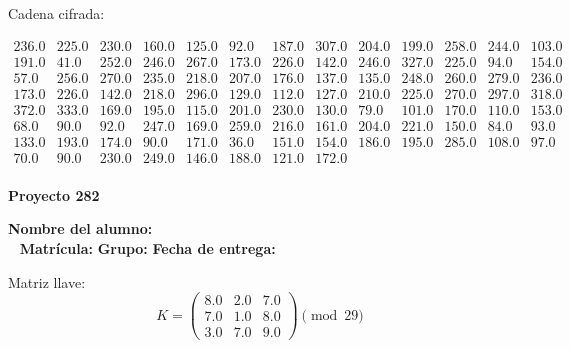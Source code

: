 \documentclass[12pt]{article}
\begin{document}
Cadena cifrada:
\begin{center}
$\begin{array}{lllllllllllll}
236.0 & 225.0 & 230.0 & 160.0 & 125.0 & 92.0 & 187.0 & 307.0 & 204.0 & 199.0 & 258.0 & 244.0 & 103.0\\
191.0 & 41.0 & 252.0 & 246.0 & 267.0 & 173.0 & 226.0 & 142.0 & 246.0 & 327.0 & 225.0 & 94.0 & 154.0\\
57.0 & 256.0 & 270.0 & 235.0 & 218.0 & 207.0 & 176.0 & 137.0 & 135.0 & 248.0 & 260.0 & 279.0 & 236.0\\
173.0 & 226.0 & 142.0 & 218.0 & 296.0 & 129.0 & 112.0 & 127.0 & 210.0 & 225.0 & 270.0 & 297.0 & 318.0\\
372.0 & 333.0 & 169.0 & 195.0 & 115.0 & 201.0 & 230.0 & 130.0 & 79.0 & 101.0 & 170.0 & 110.0 & 153.0\\
68.0 & 90.0 & 92.0 & 247.0 & 169.0 & 259.0 & 216.0 & 161.0 & 204.0 & 221.0 & 150.0 & 84.0 & 93.0\\
133.0 & 193.0 & 174.0 & 90.0 & 171.0 & 36.0 & 151.0 & 154.0 & 186.0 & 195.0 & 285.0 & 108.0 & 97.0\\
70.0 & 90.0 & 230.0 & 249.0 & 146.0 & 188.0 & 121.0 & 172.0\\
\end{array}$
\end{center}

\newpage


\textbf{Proyecto 282}

\textbf{Nombre del alumno:} \underline{\hspace{13cm}}\\\
\vspace{1cm}
\textbf{Matrícula:} \underline{\hspace{4cm}} \hspace{1cm}
\textbf{Grupo:} \underline{\hspace{2cm}}
\textbf{Fecha de entrega:} \underline{\hspace{2cm}}

\medskip

Matriz llave:
\[
K = \begin{pmatrix}
8.0 & 2.0 & 7.0\\
7.0 & 1.0 & 8.0\\
3.0 & 7.0 & 9.0
\end{pmatrix} \pmod{29}
\]
\end{document}
